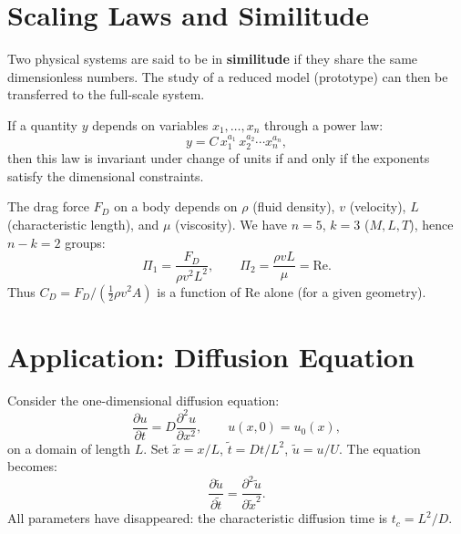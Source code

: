 \section{Scaling Laws and Similitude}
\label{sec:similitude}

\begin{definition}[Similitude]
Two physical systems are said to be in \textbf{similitude} if they
share the same dimensionless numbers.  The study of a reduced model
(prototype) can then be transferred to the full-scale system.
\end{definition}

\begin{theorem}
If a quantity $y$ depends on variables $x_1,\ldots,x_n$ through a
power law:
\[
  y = C\,x_1^{a_1}\,x_2^{a_2}\cdots x_n^{a_n},
\]
then this law is invariant under change of units if and only if the
exponents satisfy the dimensional constraints.
\end{theorem}

\begin{example}
The drag force $F_D$ on a body depends on $\rho$ (fluid density),
$v$ (velocity), $L$ (characteristic length), and $\mu$ (viscosity).
We have $n=5$, $k=3$ ($M,L,T$), hence $n-k=2$ groups:
\[
  \Pi_1 = \frac{F_D}{\rho v^2 L^2}, \qquad
  \Pi_2 = \frac{\rho v L}{\mu} = \mathrm{Re}.
\]
Thus $C_D = F_D/(\tfrac{1}{2}\rho v^2 A)$ is a function of Re alone
(for a given geometry).
\end{example}

\section{Application: Diffusion Equation}
\label{sec:diffusion_dim}

Consider the one-dimensional diffusion equation:
\[
  \frac{\partial u}{\partial t} = D\frac{\partial^2 u}{\partial x^2},
  \qquad u(x,0) = u_0(x),
\]
on a domain of length $L$.  Set $\tilde{x}=x/L$, $\tilde{t}=Dt/L^2$,
$\tilde{u}=u/U$.  The equation becomes:
\[
  \frac{\partial\tilde{u}}{\partial\tilde{t}}
  = \frac{\partial^2\tilde{u}}{\partial\tilde{x}^2}.
\]
All parameters have disappeared: the characteristic diffusion time
is $t_c = L^2/D$.

